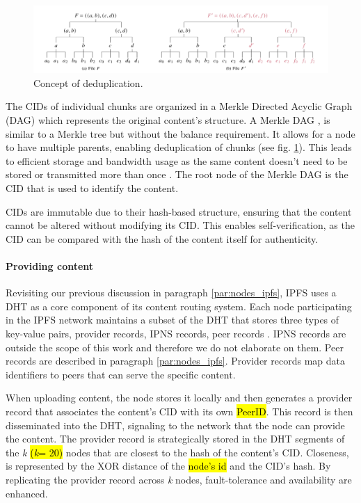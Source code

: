 \begin{figure}[htbp]
    \centerline{\includegraphics[width=\textwidth]{figs/deduplication.png}}
    \caption{Concept of deduplication. \citep{daniel_2022}}
    \label{fig:deduplication}
\end{figure}

The CIDs of individual chunks are organized in a Merkle Directed Acyclic Graph (DAG) which represents the original content's structure. A Merkle DAG \citep{benet_2014}, is similar to a Merkle tree but without the balance requirement. It allows for a node to have multiple parents, enabling deduplication of chunks (see fig. \ref{fig:deduplication}). This leads to efficient storage and bandwidth usage as the same content doesn't need to be stored or transmitted more than once \citep{trautwein_2022}. The root node of the Merkle DAG is the CID that is used to identify the content.

CIDs are immutable due to their hash-based structure, ensuring that the content cannot be altered without modifying its CID. This enables self-verification, as the CID can be compared with the hash of the content itself for authenticity.

\paragraph{Providing content}\label{par:providing_ipfs}
Revisiting our previous discussion in paragraph \ref{par:nodes_ipfs}, IPFS uses a DHT as a core component of its content routing system. Each node participating in the IPFS network maintains a subset of the DHT that stores three types of key-value pairs, provider records, IPNS records, peer records \citep{schmahmann_2020}. IPNS records are outside the scope of this work and therefore we do not elaborate on them. Peer records are described in paragraph \ref{par:nodes_ipfs}. Provider records map data identifiers to peers that can serve the specific content.

When uploading content, the node stores it locally and then generates a provider record that associates the content's CID with its own \hl{PeerID}. This record is then disseminated into the DHT, signaling to the network that the node can provide the content. The provider record is strategically stored in the DHT segments of the \textit{k} \hl{(\textit{k}= 20)} nodes that are closest to the hash of the content's CID. Closeness, is represented by the XOR distance \citep{maymounkov_2002} of the \hl{node's id} and the CID's hash. By replicating the provider record across \textit{k} nodes, fault-tolerance and availability are enhanced. 

